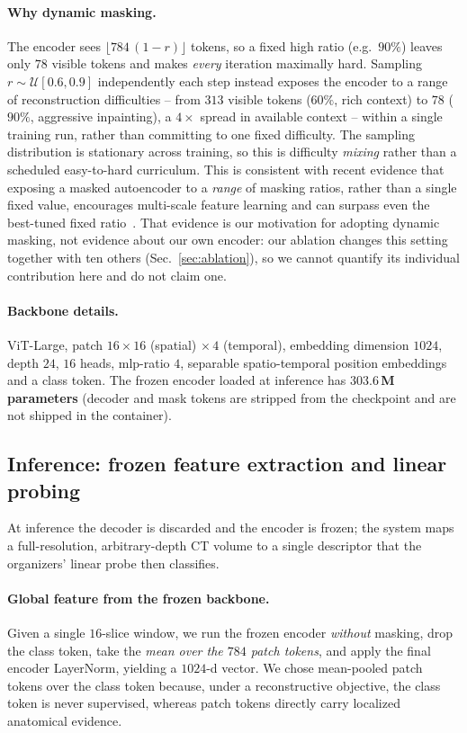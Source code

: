 \documentclass[runningheads]{llncs}
\begin{document}
\paragraph{Why dynamic masking.}
The encoder sees $\lfloor 784\,(1-r)\rfloor$ tokens, so a fixed high ratio
(e.g.\ $90\%$) leaves only $78$ visible tokens and makes \emph{every} iteration
maximally hard. Sampling $r\sim\mathcal{U}[0.6,0.9]$ independently each step
instead exposes the encoder to a range of reconstruction difficulties -- from
$313$ visible tokens ($60\%$, rich context) to $78$ ($90\%$, aggressive
inpainting), a $4\times$ spread in available context -- within a single training
run, rather than committing to one fixed difficulty. The sampling distribution
is stationary across training, so this is difficulty \emph{mixing} rather than a
scheduled easy-to-hard curriculum. This is consistent with recent evidence that
exposing a masked autoencoder to a \emph{range} of masking ratios, rather than a
single fixed value, encourages multi-scale feature learning and can surpass even
the best-tuned fixed ratio~\cite{r2mae}. That evidence is our motivation for
adopting dynamic masking, not evidence about our own encoder: our ablation
changes this setting together with ten others (Sec.~\ref{sec:ablation}), so we
cannot quantify its individual contribution here and do not claim one.

\paragraph{Backbone details.}
ViT-Large, patch $16{\times}16$ (spatial) $\times\,4$ (temporal), embedding
dimension $1024$, depth $24$, $16$ heads, mlp-ratio $4$, separable
spatio-temporal position embeddings and a class token. The frozen encoder loaded
at inference has \textbf{$303.6$\,M parameters} (decoder and mask tokens are
stripped from the checkpoint and are not shipped in the container).

\subsection{Inference: frozen feature extraction and linear probing}
\label{sec:inference}
At inference the decoder is discarded and the encoder is frozen; the system maps
a full-resolution, arbitrary-depth CT volume to a single descriptor that the
organizers' linear probe then classifies.

\paragraph{Global feature from the frozen backbone.}
Given a single $16$-slice
window, we run the frozen encoder \emph{without} masking, drop the class token, take the
\emph{mean over the $784$ patch tokens}, and apply the final encoder
LayerNorm, yielding a $1024$-d vector. We chose mean-pooled patch tokens over the
class token because, under a reconstructive objective, the class token is never
supervised, whereas patch tokens directly carry localized anatomical evidence.
\end{document}
